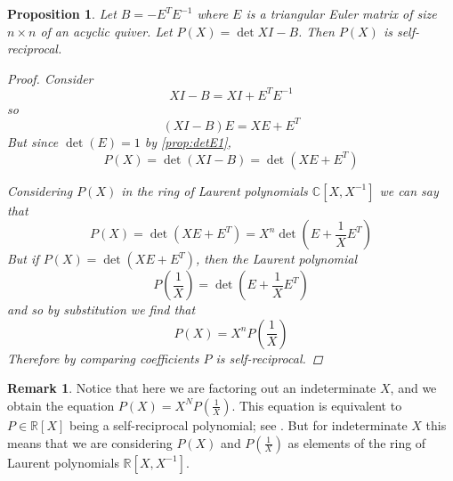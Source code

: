 \documentclass{amsart}
\theoremstyle{theorem}
\theoremstyle{theorem*}
\newtheorem{proposition}[theorem]{Proposition}
\theoremstyle{definition}
\newtheorem{remark}[theorem]{Remark}
\begin{document}
\begin{proposition}
    Let $B = - E^T E^{-1}$ where $E$ is a triangular Euler
    matrix of size $n \times n$ of an acyclic quiver. Let $P(X) = \det{XI - B}$.
    Then $P(X)$ is self-reciprocal.
    \begin{proof}
        Consider
        $$XI - B = XI + E^T E^{-1}$$
        so
        $$(XI - B)E = XE + E^T$$
        But since $\det(E) = 1$ by \ref{prop:detE1},
        $$P(X) = \det(XI - B) = \det(XE + E^T)$$

        Considering $P(X)$ in the ring of Laurent polynomials $\mathbb{C}[X, X^{-1}]$
        we can say that 
        $$P(X) = \det(XE+E^T) = X^n \det \left(E + \frac{1}{X} E^T \right)$$
        But if $P(X) = \det(XE + E^T)$, then the Laurent polynomial 
        $$P\left(\frac{1}{X}\right) = \det\left(E +  \frac{1}{X} E^T\right)$$
        and so by substitution we find that
        $$P(X) = X^n P\left(\frac{1}{X}\right)$$
        Therefore by comparing coefficients $P$ is self-reciprocal.
    \end{proof}
\end{proposition}

\begin{remark}
    Notice that here we are factoring out an indeterminate $X$, and we obtain
    the equation $P(X) = X^N P\left(\frac{1}{X}\right)$. This equation is equivalent
    to $P \in \mathbb{R}[X]$ being a self-reciprocal polynomial; see \cite{syz}.
    But for indeterminate $X$ this means that we are considering $P(X)$ and 
    $P\left(\frac{1}{X}\right)$ as elements of the ring of Laurent polynomials
    $\mathbb{R}[X, X^{-1}]$. 
\end{remark}
\end{document}
